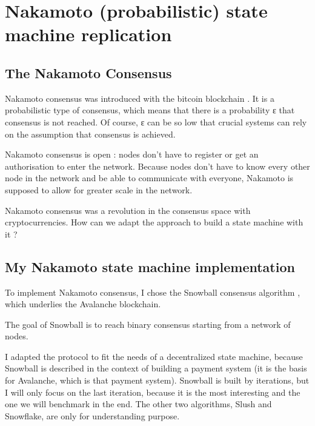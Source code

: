 \documentclass[11pt, twocolumn]{article}
\begin{document}

\section{Nakamoto (probabilistic) state machine replication}
\subsection{The Nakamoto Consensus}

Nakamoto consensus was introduced with the bitcoin blockchain \cite{bitcoin}. It is a probabilistic type of consensus, which means that there is a probability ε that consensus is not reached.
Of course, ε can be so low that crucial systems can rely on the assumption that consensus is achieved. 

Nakamoto consensus is open : nodes don't have to register or get an authorisation to enter the network.
Because nodes don't have to know every other node in the network and be able to communicate with everyone, Nakamoto is supposed to allow for greater scale in the network.

Nakamoto consensus was a revolution in the consensus space with cryptocurrencies. How can we adapt the approach to build a state machine with it ?

\subsection{My Nakamoto state machine implementation}

To implement Nakamoto consensus, I chose the Snowball consensus algorithm \cite{snowprotocol}, which underlies the Avalanche blockchain.

The goal of Snowball is to reach binary consensus starting from a network of nodes.

I adapted the protocol to fit the needs of a decentralized state machine, because Snowball is described in the context of building a payment system (it is the basis for Avalanche, which is that payment system).
Snowball is built by iterations, but I will only focus on the last iteration, because it is the most interesting and the one we will benchmark in the end. 
The other two algorithms, Slush and Snowflake, are only for understanding purpose.
\end{document}
